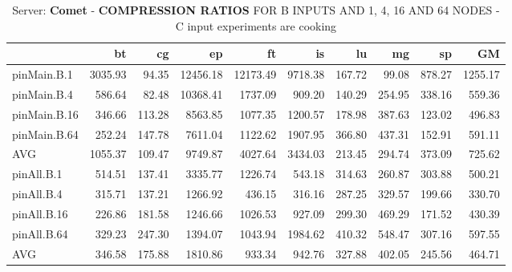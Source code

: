 \begin{table*}[]
\caption{Server: \textbf{Comet} - \textbf{COMPRESSION RATIOS} FOR B INPUTS AND 1, 4, 16 AND 64 NODES - C input experiments are cooking}
\label{comet_cr_pMpA_B_itn_p3.5}\begin{center}
\begin{tabular}{|l|rrrrrrrr|r|}
\hline
              &      bt &     cg &       ep &       ft &      is &     lu &     mg &     sp &      GM \\
\hline
 pinMain.B.1  & 3035.93 &  94.35 & 12456.18 & 12173.49 & 9718.38 & 167.72 &  99.08 & 878.27 & 1255.17 \\
 pinMain.B.4  &  586.64 &  82.48 & 10368.41 &  1737.09 &  909.20 & 140.29 & 254.95 & 338.16 &  559.36 \\
 pinMain.B.16 &  346.66 & 113.28 &  8563.85 &  1077.35 & 1200.57 & 178.98 & 387.63 & 123.02 &  496.83 \\
 pinMain.B.64 &  252.24 & 147.78 &  7611.04 &  1122.62 & 1907.95 & 366.80 & 437.31 & 152.91 &  591.11 \\
 \hline
 AVG          & 1055.37 & 109.47 &  9749.87 &  4027.64 & 3434.03 & 213.45 & 294.74 & 373.09 &  725.62 \\
 \hline
 pinAll.B.1   &  514.51 & 137.41 &  3335.77 &  1226.74 &  543.18 & 314.63 & 260.87 & 303.88 &  500.21 \\
 pinAll.B.4   &  315.71 & 137.21 &  1266.92 &   436.15 &  316.16 & 287.25 & 329.57 & 199.66 &  330.70 \\
 pinAll.B.16  &  226.86 & 181.58 &  1246.66 &  1026.53 &  927.09 & 299.30 & 469.29 & 171.52 &  430.39 \\
 pinAll.B.64  &  329.23 & 247.30 &  1394.07 &  1043.94 & 1984.62 & 410.32 & 548.47 & 307.16 &  597.55 \\
 \hline
 AVG          &  346.58 & 175.88 &  1810.86 &   933.34 &  942.76 & 327.88 & 402.05 & 245.56 &  464.71 \\
\hline
\end{tabular}
\end{center}
\end{table*}
